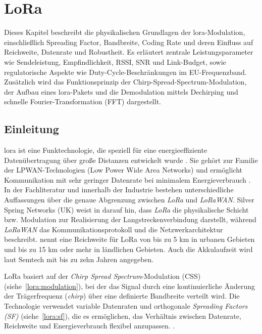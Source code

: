 %
%

\chapter{LoRa \label{lora:general}}
	Dieses Kapitel beschreibt die physikalischen Grundlagen der \acf{lora}-Modulation, einschließlich Spreading Factor, Bandbreite, Coding Rate und deren Einfluss auf Reichweite, Datenrate und Robustheit. Es erläutert zentrale Leistungsparameter wie Sendeleistung, Empfindlichkeit, RSSI, SNR und Link-Budget, sowie regulatorische Aspekte wie Duty-Cycle-Beschränkungen im EU-Frequenzband. Zusätzlich wird das Funktionsprinzip der Chirp-Spread-Spectrum-Modulation, der Aufbau eines \acs{lora}-Pakets und die Demodulation mittels Dechirping und schnelle Fourier-Transformation (FFT) dargestellt.
	
\section{Einleitung}
	\acf{lora} ist eine Funktechnologie, die speziell für eine energieeffiziente Datenübertragung über gro{\ss}e Distanzen entwickelt wurde \cite{Semtech:2015}. Sie gehört zur Familie der LPWAN-Technologien (Low Power Wide Area Networks) und ermöglicht Kommunikation mit sehr geringer Datenrate bei minimalem Energieverbrauch \cite{Semtech:2024}.	
	In der Fachliteratur und innerhalb der Industrie bestehen unterschiedliche Auffassungen über die genaue Abgrenzung zwischen \textit{LoRa\texttrademark} und \textit{LoRaWAN\texttrademark}. Silver Spring Networks (UK) weist in \textcite{ETSI:2018} darauf hin, dass \textit{LoRa} die physikalische Schicht bzw. Modulation zur Realisierung der Langstreckenverbindung darstellt, während \textit{LoRaWAN} das Kommunikationsprotokoll und die Netzwerkarchitektur beschreibt.\textcite{Semtech:2024} nennt eine Reichweite für LoRa von bis zu 5 km in urbanen Gebieten und bis zu 15 km oder mehr in ländlichen Gebieten. Auch die Akkulaufzeit wird laut Semtech mit bis zu zehn Jahren angegeben.
	
	\vspace{0.5cm}
	LoRa basiert auf der \textit{Chirp Spread Spectrum}-Modulation (CSS) (siehe~\ref{lora:modulation}), bei der das Signal durch eine kontinuierliche Änderung der Trägerfrequenz (\textit{chirp}) über eine definierte Bandbreite verteilt wird. Die Technologie verwendet variable Datenraten und orthogonale \textit{Spreading Factors (SF)} (siehe~\ref{lora:sf}), die es ermöglichen, das Verhältnis zwischen Datenrate, Reichweite und Energieverbrauch flexibel anzupassen. \cite{Semtech:2015}.



